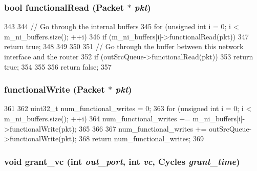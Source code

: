 \hypertarget{classNetworkInterface_a6db56c593ee28a561c47e75a859300dd}{
\subsubsection[{functionalRead}]{\setlength{\rightskip}{0pt plus 5cm}bool functionalRead ({\bf Packet} $\ast$ {\em pkt})}}
\label{classNetworkInterface_a6db56c593ee28a561c47e75a859300dd}



\begin{DoxyCode}
343 {
344     // Go through the internal buffers
345     for (unsigned int i = 0; i < m_ni_buffers.size(); ++i) {
346         if (m_ni_buffers[i]->functionalRead(pkt)) {
347             return true;
348         }
349     }
350 
351     // Go through the buffer between this network interface and the router
352     if (outSrcQueue->functionalRead(pkt)) {
353         return true;
354     }
355 
356     return false;
357 }
\end{DoxyCode}
\hypertarget{classNetworkInterface_aba9037f662122b5f2e85647d35670e5c}{
\subsubsection[{functionalWrite}]{ functionalWrite ({\bf Packet} $\ast$ {\em pkt})}}
\label{classNetworkInterface_aba9037f662122b5f2e85647d35670e5c}



\begin{DoxyCode}
361 {
362     uint32_t num_functional_writes = 0;
363     for (unsigned int i = 0; i < m_ni_buffers.size(); ++i) {
364         num_functional_writes += m_ni_buffers[i]->functionalWrite(pkt);
365     }
366 
367     num_functional_writes += outSrcQueue->functionalWrite(pkt);
368     return num_functional_writes;
369 }
\end{DoxyCode}
\hypertarget{classNetworkInterface_af90fb6c473130244fe64e30e61b714f6}{
\subsubsection[{grant\_\-vc}]{\setlength{\rightskip}{0pt plus 5cm}void grant\_\-vc (int {\em out\_\-port}, \/  int {\em vc}, \/  {\bf Cycles} {\em grant\_\-time})}}
\label{classNetworkInterface_af90fb6c473130244fe64e30e61b714f6}


